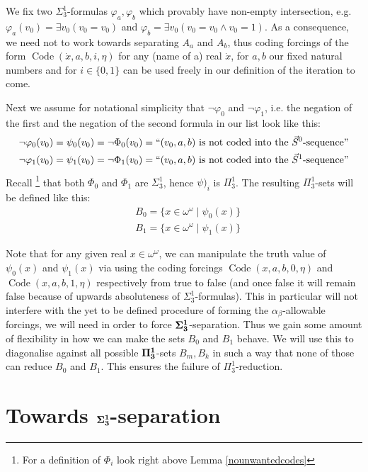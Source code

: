 \documentclass[a4paper,11pt]{article}
\begin{document}
We fix two $\Sigma^1_3$-formulas $\varphi_{a}, \varphi_{b}$ which provably have non-empty intersection, e.g. $\varphi_a (v_0) = \exists v_0 (v_0 = v_0)$ and $\varphi_b= \exists v_0 (v_0 =v_0 \land v_0 =1)$. As a consequence, we need not to work towards separating $A_a$ and $A_b$, thus coding forcings of the form
$\operatorname{Code}(\dot{x},a,b,i,\eta)$ for any (name of a) real $\dot{x}$, for $a,b$ our fixed natural numbers and for $i \in \{0,1\}$ can be used freely in our definition of the iteration to come.

Next we assume for notational simplicity that $\lnot \varphi_0$ and $\lnot \varphi_1$, i.e. the negation of the first and the negation of the second formula in our list look like this:
\begin{align*}
&\lnot \varphi_0 (v_0) = \psi_0(v_0)= \lnot \Phi_0 (v_0) = ``(v_0,a,b) \text{ is not coded into the $\vec{S}^0$-sequence} "
\\& \lnot \varphi_1 (v_0)= \psi_1(v_0)= \lnot \Phi_1 (v_0)= ``(v_0,a,b) \text{ is not coded into the $\vec{S}^1$-sequence} "
\end{align*}
Recall 
\footnote{For a definition of $\Phi_i$ look right above Lemma \ref{nounwantedcodes}} that both $\Phi_0$ and $\Phi_1$ are $\Sigma^1_3$, hence $\psi)_i$ is $\Pi^1_3$. The resulting $\Pi^1_3$-sets will be defined like this:
\begin{align*}
&B_0 = \{ x \in \omega^{\omega} \mid \psi_0(x) \}
\\&  B_1= \{ x \in \omega^{\omega} \mid  \psi_1(x) \}
\end{align*}

Note that for any given real $x \in \omega^{\omega}$, we can manipulate
the truth value of $\psi_0(x)$ and $\psi_1(x)$ via using the coding forcings 
$\operatorname{Code} (x,a,b,0,\eta)$ and $\operatorname{Code} (x,a,b,1,\eta)$ respectively from true to false (and once false it will remain false because of upwards absoluteness of $\Sigma^1_3$-formulas). This in particular will not interfere with the yet to be defined procedure of forming the $\alpha_{\beta}$-allowable forcings, we will need in order to force $\bf{\Sigma}^1_3$-separation. 
Thus we gain some amount of flexibility in how we can make the sets $B_0$ and $B_1$ behave.  We will use this to diagonalise against all possible $\bf{\Pi}^1_3$-sets $B_m,B_k$ in such a way that none of those can reduce $B_0$ and $B_1$. This ensures the failure of $\Pi^1_3$-reduction.



\section{Towards $\bf{\Sigma}^1_3$-separation}
\end{document}
